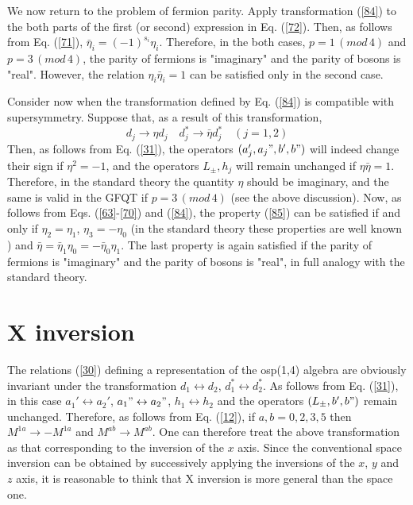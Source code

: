 \documentclass[a4paper,12pt]{article}%
\begin{document}
We now return to the problem of fermion parity. Apply
transformation (\ref{84}) to the both parts
of the first (or second) expression in Eq. (\ref{72}).
Then, as follows from Eq. (\ref{71}), 
${\bar\eta}_i=(-1)^{s_i}\eta_i$. Therefore, in the both
cases, $p=1\, (mod \, 4)$  and $p=3\, (mod \, 4)$, the
parity of fermions is "imaginary" and the parity of bosons
is "real". However, the relation $\eta_i{\bar\eta}_i=1$
can be satisfied only in the second case. 

Consider now when the transformation defined by Eq. (\ref{84})
is compatible with supersymmetry. Suppose that, as a result
of this transformation, 
\begin{equation}
d_j\rightarrow \eta d_j\quad 
d_j^*\rightarrow {\bar\eta} d_j^* \quad(j=1,2)
\label{85}
\end{equation}
Then, as follows from Eq. (\ref{31}), the operators
$(a_j',a_j",b',b")$ will indeed change their sign 
if $\eta^2=-1$, and the operators $L_{\pm},h_j$ will remain
unchanged if $\eta{\bar\eta}=1$. Therefore, in the standard
theory the quantity $\eta$ should be imaginary, and the same
is valid in the GFQT if $p=3\, (mod \, 4)$ (see the above
discussion). Now, as follows from Eqs. (\ref{63}-\ref{70}) 
and (\ref{84}), the property (\ref{85}) can be satisfied
if and only if $\eta_2=\eta_1$, $\eta_3=-\eta_0$ 
(in the standard theory these properties are well known
 \cite{Wein-super}) and 
${\bar\eta}={\bar\eta}_1\eta_0=-{\bar\eta}_0\eta_1$. The last 
property is again satisfied if the parity of fermions is
"imaginary" and the parity of bosons is "real", in full
analogy with the standard theory.

\section{X inversion}
\label{S9}

The relations (\ref{30}) defining a representation of the
osp(1,4) algebra are obviously invariant under the
transformation $d_1\leftrightarrow d_2$,
$d_1^*\leftrightarrow d_2^*$. 
As follows from Eq. (\ref{31}), in this
case $a_1'\leftrightarrow a_2'$, 
$a_1"\leftrightarrow a_2"$, $h_1\leftrightarrow h_2$
and the operators $(L_{\pm},b',b")$ remain unchanged.
Therefore, as follows from Eq. (\ref{12}), if 
$a,b=0,2,3,5$ then $M^{1a}\rightarrow -M^{1a}$ and
$M^{ab}\rightarrow M^{ab}$. One can therefore 
treat the above transformation as that corresponding
to the inversion of the $x$ axis. Since the
conventional space inversion can be obtained by
successively applying the inversions of the $x$,
$y$ and $z$ axis, it is reasonable to think that
X inversion is more general than the space one. 
\end{document}
